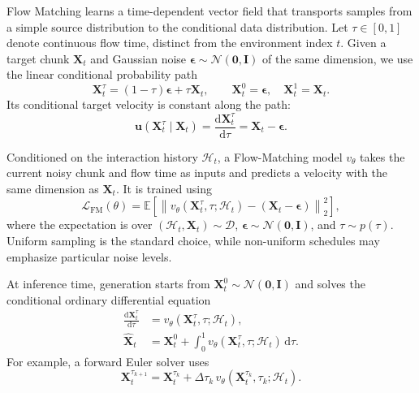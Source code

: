 Flow Matching learns a time-dependent vector field that transports samples from a
simple source distribution to the conditional data distribution. Let
$\tau\in[0,1]$ denote continuous flow time, distinct from the environment index
$t$. Given a target chunk $\mathbf{X}_t$ and Gaussian noise
$\boldsymbol{\epsilon}\sim\mathcal{N}(\mathbf{0},\mathbf{I})$ of the same dimension,
we use the linear conditional probability path
\begin{equation}
    \mathbf{X}_t^\tau
    = (1-\tau)\boldsymbol{\epsilon}+\tau\mathbf{X}_t,
    \qquad
    \mathbf{X}_t^0=\boldsymbol{\epsilon},
    \quad
    \mathbf{X}_t^1=\mathbf{X}_t.
    \label{eq:linear-flow-path}
\end{equation}
Its conditional target velocity is constant along the path:
\begin{equation}
    \mathbf{u}(\mathbf{X}_t^\tau\mid\mathbf{X}_t)
    = \frac{\mathrm{d}\mathbf{X}_t^\tau}{\mathrm{d}\tau}
    = \mathbf{X}_t-\boldsymbol{\epsilon}.
    \label{eq:conditional-flow-velocity}
\end{equation}

Conditioned on the interaction history $\mathcal{H}_t$, a Flow-Matching model
$v_\theta$ takes the current noisy chunk and flow time as inputs and predicts a
velocity with the same dimension as $\mathbf{X}_t$. It is trained using
\begin{equation}
    \mathcal{L}_{\mathrm{FM}}(\theta)
    =
    \mathbb{E}
    \left[
        \left\|
        v_\theta(\mathbf{X}_t^\tau,\tau;\mathcal{H}_t)
        -
        (\mathbf{X}_t-\boldsymbol{\epsilon})
        \right\|_2^2
    \right],
    \label{eq:flow-matching-objective}
\end{equation}
where the expectation is over
$(\mathcal H_t,\mathbf X_t)\sim\mathcal D$,
$\boldsymbol\epsilon\sim\mathcal N(\mathbf 0,\mathbf I)$, and
$\tau\sim p(\tau)$. Uniform sampling is the standard choice, while non-uniform
schedules may emphasize particular noise levels.

At inference time, generation starts from
$\mathbf{X}_t^0\sim\mathcal{N}(\mathbf{0},\mathbf{I})$ and solves the conditional
ordinary differential equation
\begingroup
\small
\begin{equation}
    \begin{aligned}
    \frac{\mathrm{d}\mathbf{X}_t^\tau}{\mathrm{d}\tau}
    &= v_\theta(\mathbf{X}_t^\tau,\tau;\mathcal{H}_t),\\
    \hat{\mathbf{X}}_t
    &= \mathbf{X}_t^0
    + \int_0^1
    v_\theta(\mathbf{X}_t^\tau,\tau;\mathcal{H}_t)\,
    \mathrm{d}\tau.
    \end{aligned}
    \label{eq:flow-matching-ode}
\end{equation}
\endgroup
For example, a forward Euler solver uses
\begin{equation}
    \mathbf{X}_t^{\tau_{k+1}}
    =
    \mathbf{X}_t^{\tau_k}
    + \Delta\tau_k\,
    v_\theta(\mathbf{X}_t^{\tau_k},\tau_k;\mathcal{H}_t).
    \label{eq:flow-matching-euler}
\end{equation}

